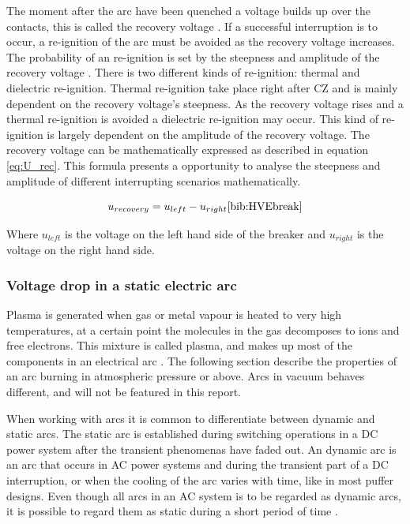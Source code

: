 \documentclass[10pt,a4paper]{article} %
\begin{document}
The moment after the arc have been quenched a voltage builds up over the contacts, this is called the recovery voltage \cite{bib:HVEbreak}. If a successful interruption is to occur, a re-ignition of the arc must be avoided as the recovery voltage increases. The probability of an re-ignition is set by the steepness and amplitude of the recovery voltage \cite{bib:HVEbreak}. There is two different kinds of re-ignition: thermal and dielectric re-ignition. Thermal re-ignition take place right after CZ and is mainly dependent on the recovery voltage's steepness. As the recovery voltage rises and a thermal re-ignition is avoided a dielectric re-ignition may occur. This kind of re-ignition is largely dependent on the amplitude of the recovery voltage. The recovery voltage can be mathematically expressed as described in equation \eqref{eq:U_rec}. This formula presents a opportunity to analyse the steepness and amplitude of different interrupting scenarios mathematically.

\begin{equation} \label{eq:U_rec}
u_{recovery}=u_{left}-u_{right} \cite{bib:HVEbreak}
\end{equation} 

Where $u_{left}$ is the voltage on the left hand side of the breaker and $u_{right}$ is the voltage on the right hand side.

\subsubsection{Voltage drop in a static electric arc} \label{sec:elarcs}

Plasma is generated when gas or metal vapour is heated to very high temperatures, at a certain point the molecules in the gas decomposes to ions and free electrons. This mixture is called plasma, and makes up most of the components in an electrical arc \cite{bib:HVEbreak}. The following section describe the properties of an arc burning in atmospheric pressure or above. Arcs in vacuum behaves different, and will not be featured in this report.

When working with arcs it is common to differentiate between dynamic and static arcs. The static arc is established during switching operations in a DC power system after the transient phenomenas have faded out. An dynamic arc is an arc that occurs in AC power systems and during the transient part of a DC interruption, or when the cooling of the arc varies with time, like in most puffer designs. Even though all arcs in an AC system is to be regarded as dynamic arcs, it is possible to regard them as static during a short period of time \cite{bib:HVEbreak}.
\end{document}
